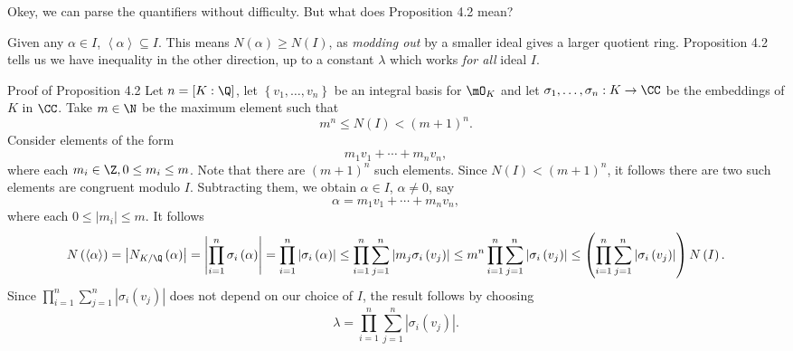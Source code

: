 \documentclass[pmath441]{subfiles}
\begin{document}
    \np Okey, we can parse the quantifiers without difficulty. But what does Proposition 4.2 mean?

    \np Given any $\alpha\in I$, $\left< \alpha \right>\subseteq I$. This means $N\left( \alpha \right)\geq N\left( I \right)$, as \textit{modding out} by a smaller ideal gives a larger quotient ring. Proposition 4.2 tells us we have inequality in the other direction, up to a constant $\lambda$ which works \textit{for all} ideal $I$. 
    
    \begin{boxyproof}{Proof of Proposition 4.2}
        Let $n=\left[ K:\Q \right]$, let $\left\lbrace v_1,\ldots,v_n \right\rbrace$ be an integral basis for $\mO_K$ and let $\sigma_1,\ldots,\sigma_n:K\to\CC$ be the embeddings of $K$ in $\CC$. Take $m\in\N$ be the maximum element such that
        \begin{equation*}
            m^n\leq N\left( I \right)<\left( m+1 \right)^n.
        \end{equation*}
        Consider elements of the form
        \begin{equation*}
            m_1v_1+\cdots+m_nv_n,
        \end{equation*}
        where each $m_i\in\Z, 0\leq m_i\leq m$. Note that there are $\left( m+1 \right)^n$ such elements. Since $N\left( I \right)<\left( m+1 \right)^n$, it follows there are two such elements are congruent modulo $I$. Subtracting them, we obtain $\alpha\in I$, $\alpha\neq 0$, say
        \begin{equation*}
            \alpha = m_1v_1+\cdots+m_nv_n,
        \end{equation*}
        where each $0\leq \left| m_i \right|\leq m$. It follows
        \begin{equation*}
            N\left( \left< \alpha \right>  \right) = \left| N_{K /\Q}\left( \alpha \right) \right| = \left| \prod^{n}_{i=1}\sigma_i\left( \alpha \right) \right| = \prod^{n}_{i=1} \left| \sigma_i\left( \alpha \right) \right| \leq \prod^{n}_{i=1}\sum^{n}_{j=1}\left| m_j\sigma_i\left( v_j \right) \right| \leq m^n\prod^{n}_{i=1}\sum^{n}_{j=1}\left| \sigma_i\left( v_j \right) \right| \leq \left( \prod^{n}_{i=1}\sum^{n}_{j=1}\left| \sigma_i\left( v_j \right) \right| \right)N\left( I \right).
        \end{equation*}
        Since $\prod^{n}_{i=1}\sum^{n}_{j=1}\left| \sigma_i\left( v_j \right) \right|$ does not depend on our choice of $I$, the result follows by choosing
        \begin{equation*}
            \lambda = \prod^{n}_{i=1}\sum^{n}_{j=1}\left| \sigma_i\left( v_j \right) \right|.
        \end{equation*}
    \end{boxyproof}
    
\end{document}
